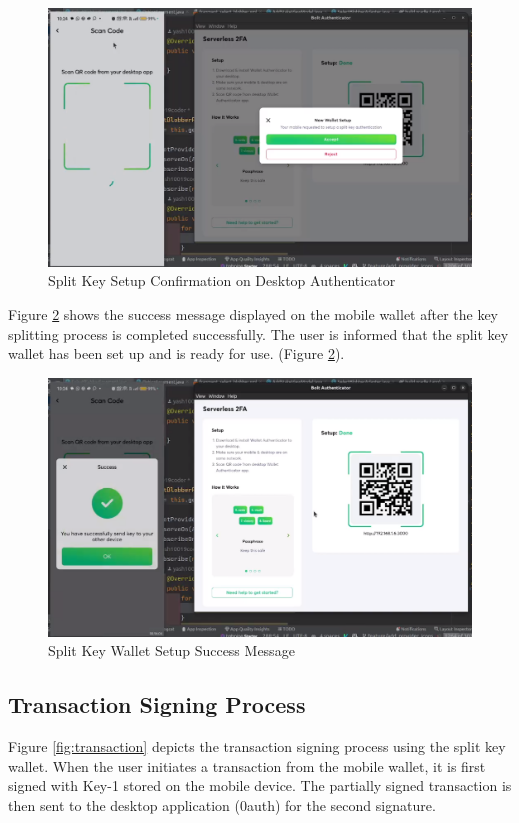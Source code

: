 \begin{figure}[h]
    \centering
    \includegraphics[width=\textwidth]{Images/setup_confirm}
    \caption{Split Key Setup Confirmation on Desktop Authenticator}
    \label{fig:setup_confirm}
\end{figure}

Figure \ref{fig:setup_success} shows the success message displayed on the mobile wallet after the key splitting process is completed successfully. The user is informed that the split key wallet has been set up and is ready for use. (Figure \ref{fig:setup_success}).

\begin{figure}[h]
    \centering
    \includegraphics[width=\textwidth]{Images/setup_success}
    \caption{Split Key Wallet Setup Success Message}
    \label{fig:setup_success}
\end{figure}

\subsection{Transaction Signing Process}
Figure \ref{fig:transaction} depicts the transaction signing process using the split key wallet. When the user initiates a transaction from the mobile wallet, it is first signed with Key-1 stored on the mobile device. The partially signed transaction is then sent to the desktop application (0auth) for the second signature.

